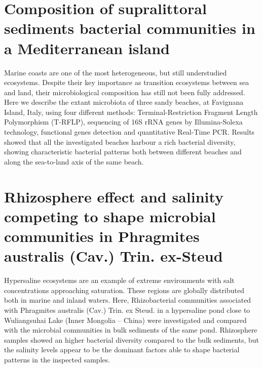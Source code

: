 \section{Composition of supralittoral sediments bacterial communities in a Mediterranean island}
Marine coasts are one of the most heterogeneous, but still understudied ecosystems. Despite their key importance as transition ecosystems between sea and land, their microbiological composition has still not been fully addressed. Here we describe the extant microbiota of three sandy beaches, at Favignana Island, Italy, using four different methods: Terminal-Restriction Fragment Length Polymorphism (T-RFLP), sequencing of 16S rRNA genes by Illumina-Solexa technology, functional genes detection and quantitative Real-Time PCR. Results showed that all the investigated beaches harbour a rich bacterial diversity, showing characteristic bacterial patterns both between different beaches and along the sea-to-land axis of the same beach.\\

\newpage

\newpage

\section{Rhizosphere effect and salinity competing to shape microbial communities in Phragmites australis (Cav.) Trin. ex-Steud}
Hypersaline ecosystems are an example of extreme environments with salt concentrations approaching saturation. These regions are globally distributed both in marine and inland waters. Here, Rhizobacterial communities associated with Phragmites australis (Cav.) Trin. ex Steud. in a hypersaline pond close to Wuliangsuhai Lake (Inner Mongolia – China) were investigated and compared with the microbial communities in bulk sediments of the same pond. Rhizosphere samples showed an higher bacterial diversity compared to the bulk sediments, but the salinity levels appear to be the dominant factors able to shape bacterial patterns in the inspected samples.\\

\newpage

\newpage

